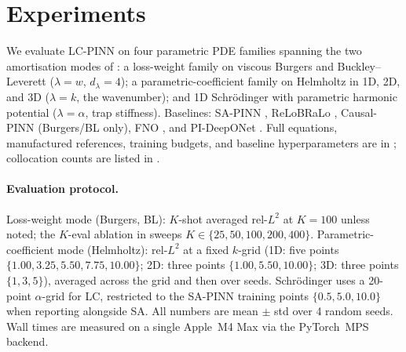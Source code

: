 \section{Experiments}
\label{sec:experiments}

We evaluate LC-PINN on four parametric PDE families spanning the two
amortisation modes of : a loss-weight family on
viscous Burgers and Buckley--Leverett ($\lambda \!=\! w$,
$d_\lambda \!=\! 4$); a parametric-coefficient family on Helmholtz
in 1D, 2D, and 3D ($\lambda \!=\! k$, the wavenumber); and 1D
Schrödinger with parametric harmonic potential ($\lambda \!=\! \alpha$,
trap stiffness). Baselines: SA-PINN \citep{mcclenny2020}, ReLoBRaLo
\citep{bischof2021}, Causal-PINN \citep{wang2024} (Burgers/BL only),
FNO \citep{li2020fno}, and PI-DeepONet \citep{wang2021pi-deeponet}.
Full equations, manufactured references, training budgets,
and baseline hyperparameters are in ;
collocation counts are listed in .

\paragraph{Evaluation protocol.}
Loss-weight mode (Burgers, BL): $K$-shot averaged rel-$L^2$ at
$K\!=\!100$ unless noted; the $K$-eval ablation in
 sweeps $K \in \{25, 50, 100, 200, 400\}$.
Parametric-coefficient mode (Helmholtz): rel-$L^2$ at a fixed
$k$-grid (1D: five points $\{1.00, 3.25, 5.50, 7.75, 10.00\}$;
2D: three points $\{1.00, 5.50, 10.00\}$; 3D: three points
$\{1, 3, 5\}$), averaged across the grid and then over seeds.
Schrödinger uses a 20-point $\alpha$-grid for LC, restricted to the
SA-PINN training points $\{0.5, 5.0, 10.0\}$ when reporting
alongside SA. All numbers are
mean $\pm$ std over 4 random seeds. Wall times are measured on a
single Apple~M4 Max via the PyTorch~MPS backend.
